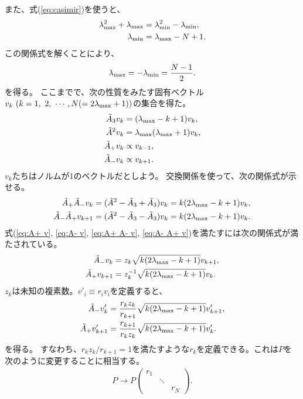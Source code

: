 \documentclass[10pt,a4paper]{jarticle}
\begin{document}
%
また、式(\ref{eq:casimir})を使うと、
\begin{align}
\lambda_{\rm max}^2 + \lambda_{\rm max} &= \lambda_{\rm min}^2 - \lambda_{\rm min}, \\
\lambda_{\rm min} &= \lambda_{\rm max} - N + 1.
\end{align}
%
この関係式を解くことにより、
\begin{align}
\lambda_{\rm max} = -\lambda_{\rm min} = \frac{N-1}{2}.
\end{align}
を得る。
%
ここまでで、次の性質をみたす固有ベクトル$v_k~(k = 1,~2,~\cdots, N (=2\lambda_{\rm max}+1))$の集合を得た。
\begin{align}
\tilde A_3 v_k &= (\lambda_{\rm max} - k + 1) v_k \label{eq:a3 v}, \\
\tilde A^2 v_k &= \lambda_{\rm max}(\lambda_{\rm max} + 1) v_k, \\
\tilde A_+ v_k &\propto v_{k-1} \label{eq:A+ v}, \\
\tilde A_- v_k &\propto v_{k+1} \label{eq:A- v}.
\end{align}
%
$v_k$たちはノルムが1のベクトルだとしよう。
%
交換関係を使って、次の関係式が示せる。
\begin{align}
\tilde A_+ \tilde A_- v_k &= (\tilde A^2 - \tilde A_3 + \tilde A_3 ) v_k = k(2\lambda_{\rm max} - k +1) v_k \label{eq:A+ A- v}, \\
\tilde A_- \tilde A_+ v_{k+1} &= (\tilde A^2 - \tilde A_3 - \tilde A_3 ) v_k = k(2\lambda_{\rm max} - k +1) v_k \label{eq:A- A+ v}.
\end{align}
%
式(\ref{eq:A+ v}, \ref{eq:A- v}, \ref{eq:A+ A- v}, \ref{eq:A- A+ v})を満たすには次の関係式が満たされている。
\begin{align}
\tilde A_- v_k &= z_k \sqrt{k(2\lambda_{\rm max} - k +1) } v_{k+1}, \label{eq:a+ v} \\
\tilde A_+ v_{k+1} &= z_k^{-1} \sqrt{k(2\lambda_{\rm max} - k +1) } v_k. \label{eq:a- v}
\end{align}
%
$z_k$は未知の複素数。$v'_i \equiv r_i v_i$を定義すると、
\begin{align}
\tilde A_- v'_k &= \frac{r_k z_k}{r_{k+1}} \sqrt{k(2\lambda_{\rm max} - k +1) } v'_{k+1},\\
\tilde A_+ v'_{k+1} &= \frac{r_{k+1}}{r_k z_k} \sqrt{k(2\lambda_{\rm max} - k +1) } v'_k.
\end{align}
を得る。
%
すなわち、$r_k z_k / r_{k+1} = 1$を満たすような$r_k$を定義できる。これは$P$を次のように変更することに相当する。
\begin{align}
P \to P \left(\begin{array}{ccc}
r_1 & & \\
    & \ddots & \\
    & & r_N
\end{array} \right).
\end{align}
\end{document}

